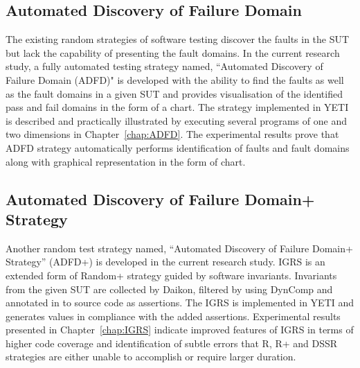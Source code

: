 \subsection{Automated Discovery of Failure Domain}
The existing random strategies of software testing discover the faults in the SUT but lack the capability of presenting the fault domains. In the current research study, a fully automated testing strategy named, ``Automated Discovery of Failure Domain (ADFD)" is developed with the ability to find the faults as well as the fault domains in a given SUT and provides visualisation of the identified pass and fail domains in the form of a chart. The strategy implemented in YETI is described and practically illustrated by executing several programs of one and two dimensions in Chapter~\ref{chap:ADFD}. The experimental results prove that ADFD strategy automatically performs identification of faults and fault domains along with graphical representation in the form of chart.

\subsection{Automated Discovery of Failure Domain+ Strategy}
Another random test strategy named, ``Automated Discovery of Failure Domain+ Strategy'' (ADFD+) is developed in the current research study. IGRS is an extended form of Random+ strategy guided by software invariants. Invariants from the given SUT are collected by Daikon, filtered by using DynComp and annotated in to source code as assertions. The IGRS is implemented in YETI and generates values in compliance with the added assertions. Experimental results presented in Chapter~\ref{chap:IGRS} indicate improved features of IGRS in terms of higher code coverage and identification of subtle errors that R, R+ and DSSR strategies are either unable to accomplish or require larger duration.  

%



